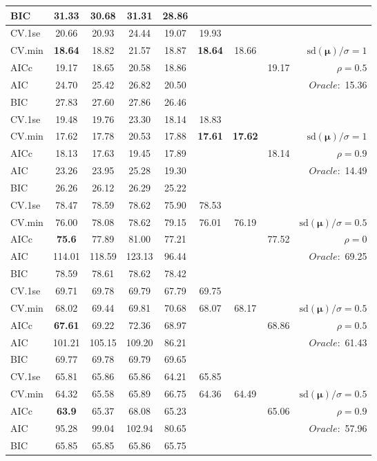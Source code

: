 \begin{table}
\begin{center}
\begin{tabular}{l*{7}{c}|r}
BIC & 31.33 & 30.68 & 31.31 & 28.86 & & & &  \\
 \hline 
CV.1se & 20.66 & 20.93 & 24.44 & 19.07 & 19.93 & & & \\
CV.min & {\bf 18.64} & 18.82 & 21.57 & 18.87 & {\bf 18.64} & 18.66 & & $\mathrm{sd}(\mathbf{\mu})/\sigma=1$ \\
AICc & 19.17 & 18.65 & 20.58 & 18.86 & & & 19.17 &  $\rho=0.5$ \\
AIC & 24.70 & 25.42 & 26.82 & 20.50 & & & &  \multirow{2}{*}{$Oracle: $ 15.36} \\
BIC & 27.83 & 27.60 & 27.86 & 26.46 & & & &  \\
 \hline 
CV.1se & 19.48 & 19.76 & 23.30 & 18.14 & 18.83 & & & \\
CV.min & 17.62 & 17.78 & 20.53 & 17.88 & {\bf 17.61} & {\bf 17.62} & & $\mathrm{sd}(\mathbf{\mu})/\sigma=1$ \\
AICc & 18.13 & 17.63 & 19.45 & 17.89 & & & 18.14 &  $\rho=0.9$ \\
AIC & 23.26 & 23.95 & 25.28 & 19.30 & & & &  \multirow{2}{*}{$Oracle: $ 14.49} \\
BIC & 26.26 & 26.12 & 26.29 & 25.22 & & & &  \\
 \hline 
CV.1se & 78.47 & 78.59 & 78.62 & 75.90 & 78.53 & & & \\
CV.min & 76.00 & 78.08 & 78.62 & 79.15 & 76.01 & 76.19 & & $\mathrm{sd}(\mathbf{\mu})/\sigma=0.5$ \\
AICc & {\bf 75.6} & 77.89 & 81.00 & 77.21 & & & 77.52 &  $\rho=0$ \\
AIC & 114.01 & 118.59 & 123.13 & 96.44 & & & &  \multirow{2}{*}{$Oracle: $ 69.25} \\
BIC & 78.59 & 78.61 & 78.62 & 78.42 & & & &  \\
 \hline 
CV.1se & 69.71 & 69.78 & 69.79 & 67.79 & 69.75 & & & \\
CV.min & 68.02 & 69.44 & 69.81 & 70.68 & 68.07 & 68.17 & & $\mathrm{sd}(\mathbf{\mu})/\sigma=0.5$ \\
AICc & {\bf 67.61} & 69.22 & 72.36 & 68.97 & & & 68.86 &  $\rho=0.5$ \\
AIC & 101.21 & 105.15 & 109.20 & 86.21 & & & &  \multirow{2}{*}{$Oracle: $ 61.43} \\
BIC & 69.77 & 69.78 & 69.79 & 69.65 & & & &  \\
 \hline 
CV.1se & 65.81 & 65.86 & 65.86 & 64.21 & 65.85 & & & \\
CV.min & 64.32 & 65.58 & 65.89 & 66.75 & 64.36 & 64.49 & & $\mathrm{sd}(\mathbf{\mu})/\sigma=0.5$ \\
AICc & {\bf 63.9} & 65.37 & 68.08 & 65.23 & & & 65.06 &  $\rho=0.9$ \\
AIC & 95.28 & 99.04 & 102.94 & 80.65 & & & &  \multirow{2}{*}{$Oracle: $ 57.96} \\
BIC & 65.85 & 65.85 & 65.86 & 65.75 & & & &  \\
 \hline 
\end{tabular}
\end{center}
\vspace{-1cm}
\end{table}




